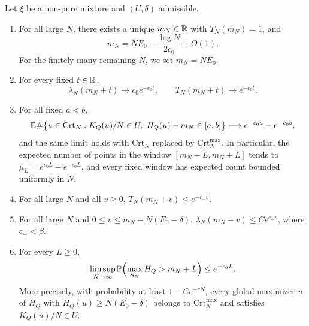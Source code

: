 \begin{theorem}\label{thm:mo-microscopic}
Let $\xi$ be a non-pure mixture and $(U,\delta)$ admissible.
\begin{enumerate}
\item[(a)] For all large $N$, there exists a unique $m_N\in\mathbb R$ with $T_N(m_N)=1$, and
\begin{equation}\label{eq:mo-centering}
m_N=NE_0-\frac{\log N}{2c_0}+O(1).
\end{equation}
For the finitely many remaining $N$, we set $m_N=NE_0$.
\item[(b)] For every fixed $t\in\mathbb R$,
\begin{equation}\label{eq:mo-tail-limit}
\lambda_N(m_N+t)\longrightarrow c_0e^{-c_0t},\qquad T_N(m_N+t)\longrightarrow e^{-c_0t}.
\end{equation}
\item[(c)] For all fixed $a<b$,
\begin{equation}\label{eq:mo-window-limit}
\E\#\bigl\{u\in\mathrm{Crt}_N:K_Q(u)/N\in U,\ H_Q(u)-m_N\in[a,b]\bigr\}\longrightarrow e^{-c_0a}-e^{-c_0b},
\end{equation}
and the same limit holds with $\mathrm{Crt}_N$ replaced by $\mathrm{Crt}_N^{\max}$. In particular, the expected number of points in the window $[m_N-L,m_N+L]$ tends to $\mu_L=e^{c_0L}-e^{-c_0L}$, and every fixed window has expected count bounded uniformly in $N$.
\item[(d)] For all large $N$ and all $v\ge0$, $T_N(m_N+v)\le e^{-c_-v}$.
\item[(e)] For all large $N$ and $0\le v\le m_N-N(E_0-\delta)$, $\lambda_N(m_N-v)\le Ce^{c_+v}$, where $c_+<\beta$.
\item[(f)] For every $L\ge0$,
\begin{equation}\label{eq:mo-ground-upper}
\limsup_{N\to\infty}\mathbb P\Bigl(\max_{S_N}H_Q>m_N+L\Bigr)\le e^{-c_0L}.
\end{equation}
More precisely, with probability at least $1-Ce^{-cN}$, every global maximizer $u$ of $H_Q$ with $H_Q(u)\ge N(E_0-\delta)$ belongs to $\mathrm{Crt}_N^{\max}$ and satisfies $K_Q(u)/N\in U$.
\end{enumerate}
\end{theorem}

